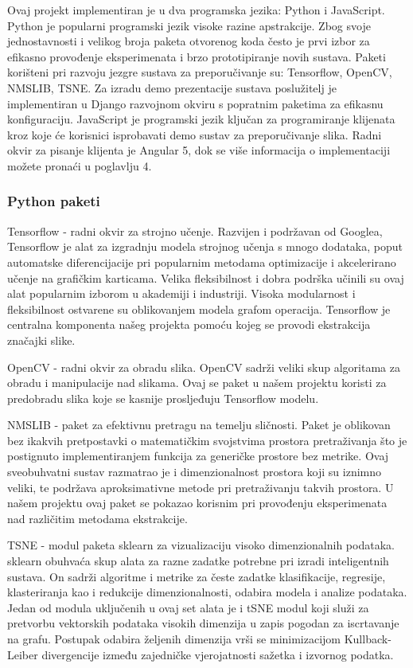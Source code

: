 \documentclass[times, utf8, proizvoljni, numeric]{fer}
\begin{document}
Ovaj projekt implementiran je u dva programska jezika: Python i JavaScript. 
Python je popularni programski jezik visoke razine apstrakcije. Zbog svoje jednostavnosti i velikog broja paketa otvorenog koda često je prvi izbor za efikasno provođenje eksperimenata i brzo prototipiranje novih sustava. Paketi korišteni pri razvoju jezgre sustava za preporučivanje su: Tensorflow, OpenCV, NMSLIB, TSNE. Za izradu demo prezentacije sustava poslužitelj je implementiran u Django razvojnom okviru s popratnim paketima za efikasnu konfiguraciju. 
JavaScript je programski jezik ključan za programiranje klijenata kroz koje će korisnici isprobavati demo sustav za preporučivanje slika. Radni okvir za pisanje klijenta je Angular 5, dok se više informacija o implementaciji možete pronaći u poglavlju 4.

\subsubsection{Python paketi }

Tensorflow \cite{tensorflow2015-whitepaper} - radni okvir za strojno učenje. Razvijen i podržavan od Googlea, Tensorflow je alat za izgradnju modela strojnog učenja s mnogo dodataka, poput automatske diferencijacije pri popularnim metodama optimizacije i akcelerirano učenje na grafičkim karticama. Velika fleksibilnost i dobra podrška učinili su ovaj alat popularnim izborom u akademiji i industriji. Visoka modularnost i fleksibilnost ostvarene su oblikovanjem modela grafom operacija.
Tensorflow je centralna komponenta našeg projekta pomoću kojeg se provodi ekstrakcija značajki slike.

OpenCV \cite{itseez2015opencv} - radni okvir za obradu slika. OpenCV sadrži veliki skup algoritama za obradu i manipulacije nad slikama. Ovaj se paket u našem projektu koristi za predobradu slika koje se kasnije prosljeđuju Tensorflow modelu.


NMSLIB \cite{NMSLIB} - paket za efektivnu pretragu na temelju sličnosti. Paket je oblikovan bez ikakvih pretpostavki o matematičkim svojstvima prostora pretraživanja što je postignuto implementiranjem funkcija za generičke prostore bez metrike. Ovaj sveobuhvatni sustav razmatrao je i dimenzionalnost prostora koji su iznimno veliki, te podržava aproksimativne metode pri pretraživanju takvih prostora. U našem projektu ovaj paket se pokazao korisnim pri provođenju eksperimenata nad različitim metodama ekstrakcije. 


TSNE \cite{TSNE} - modul paketa sklearn za vizualizaciju visoko dimenzionalnih podataka. sklearn obuhvaća skup alata za razne zadatke potrebne pri izradi inteligentnih sustava. On sadrži algoritme i metrike za česte zadatke klasifikacije, regresije, klasteriranja kao i redukcije dimenzionalnosti, odabira modela i analize podataka. Jedan od modula uključenih u ovaj set alata je i tSNE modul koji služi za pretvorbu vektorskih podataka visokih dimenzija u zapis pogodan za iscrtavanje na grafu. Postupak odabira željenih dimenzija vrši se minimizacijom Kullback-Leiber divergencije između zajedničke vjerojatnosti sažetka i izvornog podatka.
\end{document}
